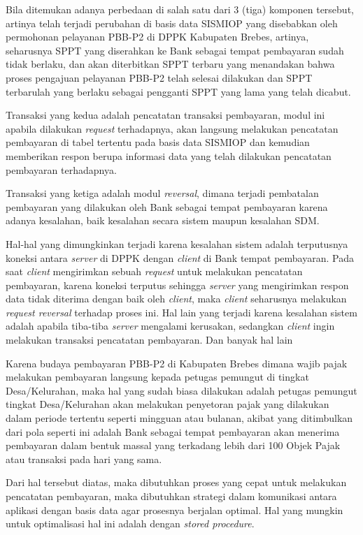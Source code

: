 \documentclass[pdftex,12pt, oneside]{article}
\begin{document}
Bila ditemukan adanya perbedaan di salah satu dari 3 (tiga) komponen tersebut, artinya telah terjadi perubahan di basis data SISMIOP yang disebabkan oleh permohonan pelayanan PBB-P2 di DPPK Kabupaten Brebes, artinya, seharusnya SPPT yang diserahkan ke Bank sebagai tempat pembayaran sudah tidak berlaku, dan akan diterbitkan SPPT terbaru yang menandakan bahwa proses pengajuan pelayanan PBB-P2 telah selesai dilakukan dan SPPT terbarulah yang berlaku sebagai pengganti SPPT yang lama yang telah dicabut.

Transaksi yang kedua adalah pencatatan transaksi pembayaran, modul ini apabila dilakukan \textit{request} terhadapnya, akan langsung melakukan pencatatan pembayaran di tabel tertentu pada basis data SISMIOP dan kemudian memberikan respon berupa informasi data yang telah dilakukan pencatatan pembayaran terhadapnya.

Transaksi yang ketiga adalah modul \textit{reversal}, dimana terjadi pembatalan pembayaran yang dilakukan oleh Bank sebagai tempat pembayaran karena adanya kesalahan, baik kesalahan secara sistem maupun kesalahan SDM. 

Hal-hal yang dimungkinkan terjadi karena kesalahan sistem adalah terputusnya koneksi antara \textit{server} di DPPK dengan \textit{client} di Bank tempat pembayaran. Pada saat \textit{client} mengirimkan sebuah \textit{request} untuk melakukan pencatatan pembayaran, karena koneksi terputus sehingga \textit{server} yang mengirimkan respon data tidak diterima dengan baik oleh \textit{client}, maka \textit{client} seharusnya melakukan \textit{request reversal} terhadap proses ini. Hal lain yang terjadi karena kesalahan sistem adalah apabila tiba-tiba \textit{server} mengalami kerusakan, sedangkan \textit{client} ingin melakukan transaksi pencatatan pembayaran. Dan banyak hal lain 

Karena budaya pembayaran PBB-P2 di Kabupaten Brebes dimana wajib pajak melakukan pembayaran langsung kepada petugas pemungut di tingkat Desa/Kelurahan, maka hal yang sudah biasa dilakukan adalah petugas pemungut tingkat Desa/Kelurahan akan melakukan penyetoran pajak yang dilakukan dalam periode tertentu seperti mingguan atau bulanan, akibat yang ditimbulkan dari pola seperti ini adalah Bank sebagai tempat pembayaran akan menerima pembayaran dalam bentuk massal yang terkadang lebih dari 100 Objek Pajak atau transaksi pada hari yang sama. 

Dari hal tersebut diatas, maka dibutuhkan proses yang cepat untuk melakukan pencatatan pembayaran, maka dibutuhkan strategi dalam komunikasi antara aplikasi dengan basis data agar prosesnya berjalan optimal. Hal yang mungkin untuk optimalisasi hal ini adalah dengan \textit{stored procedure}.
\end{document}
